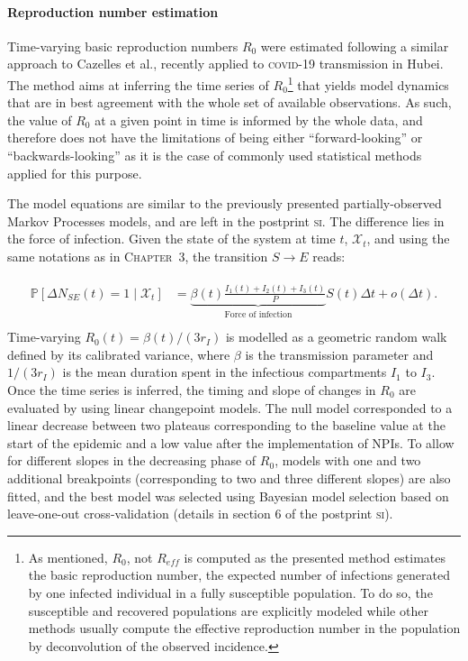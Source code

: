  \paragraph{Reproduction number estimation} Time-varying basic reproduction numbers $R_0$ were estimated following a similar approach to Cazelles et al.\cite{Cazelles:AccountingNonstationarityEpidemiology:2018}, recently applied to \textsc{covid}-19 transmission in Hubei\cite{Kucharski:EarlyDynamicsTransmission:2020}. The method aims at inferring the time series of $R_0$\footnote{As mentioned, $R_0$, not $R_{eff}$ is computed as the presented method estimates the basic reproduction number, \ie the expected number of infections generated by one infected individual in a fully susceptible population. To do so, the susceptible and recovered populations are explicitly modeled while other methods usually compute the effective reproduction number in the population by deconvolution of the observed incidence.} that yields model dynamics that are in best agreement with the whole set of available observations. As such, the value of $R_0$ at a given point in time is informed by the whole data, and therefore does not have the limitations of being either “forward-looking” or “backwards-looking” as it is the case of commonly used statistical methods applied for this purpose\cite{Wallinga:DifferentEpidemicCurves:2004,Cori:NewFrameworkSoftware:2013,Lipsitch:CommentPanLiu:2020}. 
 
The model equations are similar to the previously presented partially-observed Markov Processes models, and are left in the postprint \textsc{si}. The difference lies in the force of infection. Given the state of the system at time \(t\), \(\mathcal{X}_t\), and using the same notations as in \textsc{Chapter~3}, the transition $S \longrightarrow E$ reads:

\begin{gather}
\begin{aligned}
    \mathbb{P}\left[ \Delta N_{SE}(t) = 1 \mid\mathcal{X}_t\right] &=  \underbrace{\beta(t)  \frac{I_1(t) + I_2(t) + I_3(t)}{P}}_{\text{Force of infection}} S(t) \Delta t + o(\Delta t).\\
    \end{aligned}
\end{gather}
Time-varying $R_0(t) = \beta(t)/(3r_I)$ is modelled as a geometric random walk defined by its calibrated variance, where $\beta$ is the transmission parameter and $1/(3r_I)$ is the mean duration spent in the infectious compartments $I_1$ to $I_3$. Once the time series is inferred, the timing and slope of changes in $R_0$ are evaluated by using linear changepoint models\cite{Lindelov:McpPackageRegression:2020}. The null model corresponded to a linear decrease between two plateaus corresponding to the baseline value at the start of the epidemic and a low value after the implementation of NPIs. To allow for different slopes in the decreasing phase of $R_0$, models with one and two additional breakpoints (corresponding to two and three different slopes) are also fitted, and the best model was selected using Bayesian model selection based on leave-one-out cross-validation (details in section 6 of the postprint \textsc{si}). 

